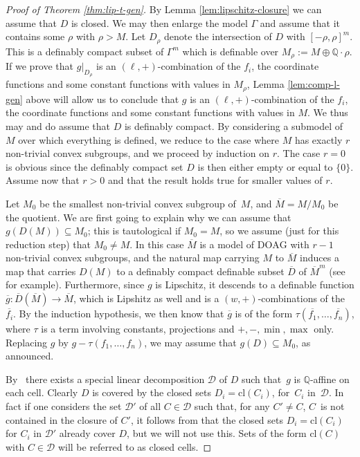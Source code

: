 \documentclass[JEP,XML,SOM,Unicode,ThmDefs,NoEqCountersInSection,published]{cedram}
\newcommand{\cl}{\mathrm{cl}}
\newcommand{\DOAG}{\mathrm{DOAG}}
\newcommand{\Q}{\mathbb Q}
\theoremstyle{plain}
\theoremstyle{definition}
\begin{document}
\begin{proof}[Proof of Theorem \ref{thm:lip-t-gen}]
By Lemma \ref{lem:lipschitz-closure}
we can assume that $D$ is closed.
We may then enlarge the model $\Gamma$
and assume that it contains some
$\rho$ with $\rho>M$. Let
$D_\rho$ denote the
intersection of $D$ with $[-\rho,\rho]^m$.
This is a definably compact subset of $\Gamma^m$
which is definable over $M_\rho:=M\oplus \Q\cdot \rho$.
If we prove that $g|_{D_\rho}$
is an $(\ell,+)$-combination of the $f_i$, the coordinate
functions and some constant functions with values in $M_\rho$,
Lemma \ref{lem:comp-l-gen}
above will allow us to conclude that $g$
is an $(\ell,+)$-combination of the $f_i$, the coordinate
functions and some constant functions with values in $M$.
We thus may and do assume that $D$ is definably compact.
By considering a
submodel of~$M$ over which everything is defined, we reduce to
the case
where
$M$ has exactly $r$ non-trivial convex subgroups,
and we proceed by induction
on $r$. The case $r=0$
is obvious since the definably compact set $D$ is then either empty
or equal to
$\{0\}$. Assume now
that $r>0$ and that the result holds true
for smaller values of $r$.\enlargethispage{.5\baselineskip}%

Let $M_0$ be the smallest non-trivial convex subgroup of~$M$, and $\overline{M}=M/M_0$ be the quotient.
We are first going to explain why we can assume that $g(D(M))
\subseteq M_0$; this is tautological if $M_0=M$, so we assume
(just for this reduction step) that $M_0\neq M$.
In this case $\overline M$
is a model of $\DOAG$ with $r-1$ non-trivial convex subgroups, and the natural map carrying $M$ to $\overline{M}$ induces a map that carries $D(M)$ to a definably compact
definable subset $\overline{D}$ of $\overline{M}^m$ (see~\cite[Th.\,4.1.1]{BP} for example). Furthermore, since $g$ is Lipschitz, it
descends to a definable function $\overline{g}:\overline{D}(\overline{M})\to \overline{M}$, which is Lipshitz as well
and is a $(w,+)$-combinations of the $\overline{f_i}$.
By the induction hypothesis, we then know that $\overline{g}$ is of the form $\tau(\overline{f_1},\ldots,\overline{f_n})$, where $\tau$ is a term involving constants, projections and $+,-,\min,\max$ only. Replacing $g$ by $g-\tau(f_1,\ldots,f_n)$, we may assume that $g(D)\subseteq M_0$, as announced.

By~\cite[Fact 2.2]{elef} there exists a special linear decomposition $\mathcal{D}$ of $D$ such that~$g$ is $\Q$-affine on each cell.
Clearly $D$ is covered by the closed sets $D_i = \cl (C_i)$, for~$C_i$ in~$\mathcal{D}$.
In fact if one considers the set
$\mathcal{D}'$ of all $C\in \mathcal{D}$ such that, for any $C'\neq C$, $C$~is not contained in the closure of $C'$, it follows from
\cite[Fact 2.3]{elef} that the closed sets $D_i = \cl (C_i)$ for
$C_i$ in $\mathcal{D}'$ already cover $D$, but we will not use this. Sets of the form $\cl (C)$ with $C \in \mathcal{D}$ will be referred to as closed cells.


\end{proof}
\end{document}

